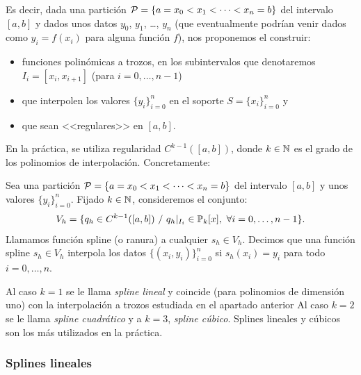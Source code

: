 Es decir, dada una partición 
${\cal P}= \{a = x_0 <x_1 < \cdots <x_n=b\}$
del intervalo $[a,b]$ y dados unos datos $y_0$, $y_1$, \dots, $y_n$
(que eventualmente podrían venir dados como $y_i=f(x_i)$ para alguna
función $f$), nos proponemos el construir:
\begin{itemize}
\item  funciones polinómicas a trozos, en los subintervalos que
  denotaremos $I_i=[x_{i},x_{i+1}]$ (para $ i=0,\dots,n-1$)
\item que interpolen los valores $\{y_i\}_{i=0}^n$ en el soporte
  $S=\{x_i\}_{i=0}^n$ y
\item que sean <<regulares>> en $[a,b]$.
\end{itemize}
En la práctica, se utiliza regularidad $C^{k-1}([a,b])$, donde
$k\in\operatorname{{\mathbb N}}$ es el grado de los polinomios de
interpolación. Concretamente:%

\begin{definition}
  \label{def:funcion-spline}
  Sea una partición ${\cal P}= \{a = x_0 <x_1 < \cdots <x_n=b\}$ del
  intervalo $[a,b]$ y unos valores $\{y_i\}_{i=0}^n$. Fijado
  $k\in\operatorname{{\mathbb N}}$, consideremos el conjunto:
  \begin{equation*}
    V_h = \{q_h \in C^{k-1}([a,b])\ / \ q_h|_{I_i}\in  \operatorname{{\mathbb P}}_k[x],\ \forall i=0,\dots,n-1\}.
\end{equation*}
Llamamos función spline (o ranura) a cualquier $s_h\in V_h$. Decimos que una
función spline $s_h\in V_h$ interpola los datos $\{(x_i,y_i)\}_{i=0}^n$
si $s_h(x_i)=y_i$ para todo $i=0,\dots,n$.
\end{definition}

Al caso $k=1$ se le llama \textit{spline lineal} y coincide (para
polinomios de dimensión uno) con la interpolación a trozos estudiada
en el apartado anterior Al caso $k=2$ se le llama \textit{spline
  cuadrático} y a $k=3$, \textit{spline cúbico}. Splines lineales y
cúbicos son los más utilizados en la práctica.

\subsubsection{Splines lineales}
\label{sec:splines-lineales}

